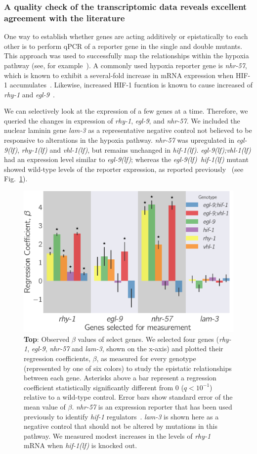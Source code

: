 \documentclass[10pt, onecolumn]{article}
\newcommand{\qval}[1]{$q<10^{-#1}$}
\newcommand{\gene}[1]{\emph{#1}}
\newcommand{\nhr}{\emph{\mbox{nhr-57}}}
\newcommand{\lam}{\emph{\mbox{lam-3}}}
\newcommand{\egl}{\emph{\mbox{egl-9}(lf)}}
\newcommand{\rhy}{\emph{\mbox{rhy-1}(lf)}}
\newcommand{\vhl}{\emph{\mbox{vhl-1}(lf)}}
\newcommand{\eglvhl}{\emph{\mbox{egl-9(lf);vhl-1(lf)}}}
\newcommand{\eglhif}{\emph{\mbox{egl-9(lf)}~\mbox{hif-1(lf)}}}
\newcommand{\hif}{\emph{\mbox{hif-1(lf)}}}
\newcommand{\hifp}{HIF-1}
\begin{document}
\subsubsection*{A quality check of the transcriptomic data reveals excellent agreement
            with the literature}
\label{sub:quality_check}
One way to establish whether genes are acting additively or epistatically to each
other is to perform qPCR of a reporter gene in the single and double mutants. This
approach was used to successfully map the relationships within the hypoxia
pathway (see, for example~\cite{Shao2009,Shen2006}). A commonly used hypoxia reporter
gene is \nhr{}, which is known to exhibit a several-fold increase in mRNA
expression when \hifp{} accumulates~\cite{Shen2006,Shen2005,Park2012}. Likewise,
increased \hifp{} fucntion is known to cause increased of \gene{rhy-1}
and \gene{egl-9}~\cite{Powell-Coffman2010}.

We can
selectively look at the expression of a few genes at a time. Therefore, we
queried the changes in expression of \gene{rhy-1}, \gene{egl-9}, and \nhr{}. We
included the nuclear laminin gene \lam{} as a representative negative control not
believed to be responsive to alterations in the hypoxia pathway.
\nhr{} was upregulated in \egl{}, \rhy{} and \vhl{}, but remains unchanged in \hif{}.
\eglvhl{} had an expression level similar to \egl{}; whereas the
\eglhif{} mutant showed wild-type levels of the reporter expression, as reported
previously~\cite{Shen2006} (see Fig.~\ref{fig:qpcr}).

\begin{figure}[tbhp]
\centering
\includegraphics[width=.5\linewidth]{../figs/qpcr.pdf}
\caption{
\textbf{Top}: Observed $\beta$ values of select genes. We selected
four genes (\gene{rhy-1}, \gene{egl-9}, \nhr{} and \lam{}, shown on the x-axis)
and plotted their regression coefficients, $\beta$, as measured for every
genotype (represented by one of six colors) to study the epistatic relationships
between each gene. Asterisks above a bar represent a regression coefficient
statistically significantly different from 0 (\qval{1}) relative to a wild-type
control. Error bars show standard error of the mean
value of $\beta$. \nhr{} is an expression reporter that has been used previously
to identify \gene{hif-1} regulators~\cite{Shen2006,Shao2009}. \lam{} is shown here
as a negative control that should not be altered by mutations in this pathway.
We measured modest increases in the levels of \gene{rhy-1} mRNA when \hif{} is
knocked out.
}
\label{fig:qpcr}
\end{figure}
\end{document}
